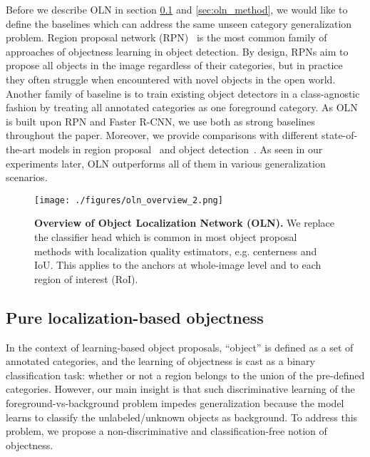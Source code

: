\documentclass[10pt,twocolumn,letterpaper]{article}
\newcommand{\OURS}{OLN}
\begin{document}
Before we describe \OURS{} in section \ref{sec:localization_objectness} and \ref{sec:oln_method}, we would like to define the baselines which can address the same unseen category generalization problem. Region proposal network (RPN)~\cite{fasterNIPS2015,vu2019cascade, wang2019region} is the most common family of approaches of objectness learning in object detection. By design, RPNs aim to propose all objects in the image regardless of their categories, but in practice they often struggle when encountered with novel objects in the open world. Another family of baseline is to train existing object detectors in a class-agnostic fashion by treating all annotated categories as one foreground category. As OLN is built upon RPN and Faster R-CNN, we use both as strong baselines throughout the paper. Moreover, we provide comparisons with different state-of-the-art models in region proposal~\cite{fasterNIPS2015,vu2019cascade,wang2019region} and object detection~\cite{he2017mask,fasterNIPS2015,tian2019fcos}. As seen in our experiments later, OLN outperforms all of them in various generalization scenarios. 

\begin{figure}
\centering
\texttt{[image: ./figures/oln\_overview\_2.png]}
\caption{\small{\textbf{Overview of Object Localization Network (\OURS{}).} We replace the classifier head which is common in most object proposal methods with localization quality estimators, e.g. centerness and IoU. This applies to the anchors at whole-image level and to each region of interest (RoI).}}
\label{fig:model}
\end{figure}

\subsection{Pure localization-based objectness}
\label{sec:localization_objectness}
In the context of learning-based object proposals, ``object” is defined as a set of annotated categories, and the learning of objectness is cast as a binary classification task: whether or not a region belongs to the union of the pre-defined categories. However, our main insight is that such discriminative learning of the foreground-vs-background problem impedes generalization because the model learns to classify the unlabeled/unknown objects as background. To address this problem, we propose a non-discriminative and classification-free notion of objectness.
\end{document}
